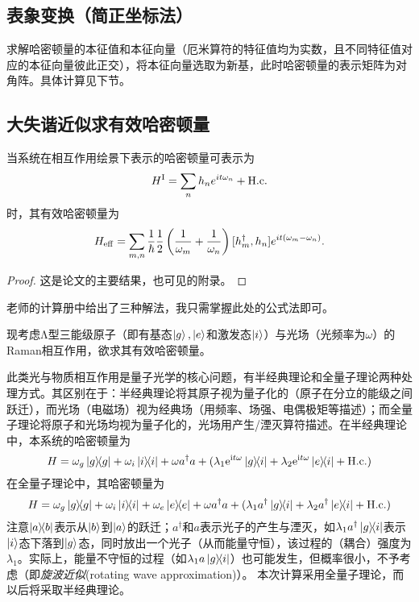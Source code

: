 \documentclass[
fontsetup = font-setup-open.tex,
titlesetup = titles-setup.tex
]{AJbook}
\numberwithin{equation}{section}
\begin{document}
\subsection{表象变换（简正坐标法）}
求解哈密顿量的本征值和本征向量（厄米算符的特征值均为实数，且不同特征值对应的本征向量彼此正交），将本征向量选取为新基，此时哈密顿量的表示矩阵为对角阵。具体计算见下节。
\subsection{大失谐近似求有效哈密顿量}
\begin{lemma}[有效哈密顿量公式]\label{heff}
当系统在相互作用绘景下表示的哈密顿量可表示为
\begin{equation}\label{key}
H^{\mathrm{I}}=\sum_{n}h_ne^{it\omega_n}+\mathrm{H.c.}
\end{equation}
时，其有效哈密顿量为
\begin{equation}\label{key}
H_{\mathrm{eff}}=\sum_{m,n}\frac{1}{\hbar}\frac{1}{2}\left(\frac{1}{\omega_m}+\frac{1}{\omega_n}\right)[h_m^\dagger,h_n]e^{it(\omega_m-\omega_n)}.
\end{equation}
\end{lemma}
\begin{proof}
这是论文\cite{James2007EffectiveHT}的主要结果，也可见\cite{zzmqo}的附录。
\end{proof}
\begin{remark}
老师的计算册中给出了三种解法，我只需掌握此处的公式法即可。
\end{remark}
现考虑Λ型三能级原子（即有基态$ \ket{g},\ket{e} $和激发态$ \ket{i} $）与光场（光频率为$ \omega $）的Raman相互作用，欲求其有效哈密顿量。

此类光与物质相互作用是量子光学的核心问题，有半经典理论和全量子理论两种处理方式。其区别在于：半经典理论将其原子视为量子化的（原子在分立的能级之间跃迁），而光场（电磁场）视为经典场（用频率、场强、电偶极矩等描述）；而全量子理论将原子和光场均视为量子化的，光场用产生/湮灭算符描述。在半经典理论中，本系统的哈密顿量为
\begin{equation}\label{key}
H=\omega_g\ketbra{g}{g}+\omega_i\ketbra{i}{i}+\omega a^\dagger a+(\lambda_1\mathrm{e}^{\mathrm{i}t \omega}\ketbra{g}{i}+\lambda_2\mathrm{e}^{\mathrm{i}t \omega}\ketbra{e}{i}+\mathrm{H.c.})
\end{equation}
在全量子理论中，其哈密顿量为
\begin{equation}\label{key}
H=\omega_g\ketbra{g}{g}+\omega_i\ketbra{i}{i}+\omega_e\ketbra{e}{e}+\omega a^\dagger a+(\lambda_1a^\dagger\ketbra{g}{i}+\lambda_2a^\dagger\ketbra{e}{i}+\mathrm{H.c.})
\end{equation}
注意$ \ketbra{a}{b} $表示从$ \ket{b} $到$ \ket{a} $的跃迁；$ a^\dagger $和$ a $表示光子的产生与湮灭，如$ \lambda_1a^\dagger\ketbra{g}{i} $表示$ \ket{i} $态下落到$ \ket{g} $态，同时放出一个光子（从而能量守恒），该过程的（耦合）强度为$ \lambda_1 $。实际上，能量不守恒的过程（如$ \lambda_1a\ketbra{g}{i} $）也可能发生，但概率很小，不予考虑（即\emph{旋波近似}(rotating wave approximation)）。
本次计算采用全量子理论，而以后将采取半经典理论。
\end{document}
